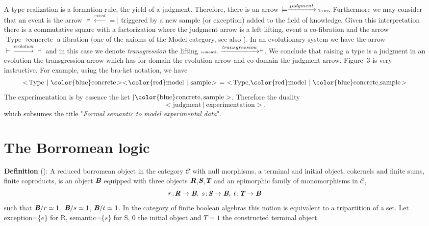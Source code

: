 \noindent
A type realization is a formation rule, the yield of a judgment. Therefore,
there is an arrow 
$\models\xrightarrow{judgment}\text{\tiny Type}$.
Furthermore we may consider that an event is the arrow 
$\models\xleftarrow{event}=\!\!\!|$ triggered by a new sample (or exception) added to the field of knowledge.
Given this interpretation there is a commutative square with a factorization where the 
judgment arrow is a left lifting, event a co-fibration and the arrow  
$\text{Type}\rightarrow\text{concrete}$
a fibration (one of the axioms of the Model category, see also \cite{awodey_2009}).
In an evolutionary system we have the arrow 
$\overset{}{\vdash}\xrightarrow{evolution}\overset{}{\dashv}$
and in this case we denote {\it transgression} the lifting 
$\overset{}{\text{\tiny semantic}}\xrightarrow{transgression}\overset{}{\vdash}$.  
We conclude that raising a type is a judgment in an evolution the transgression
arrow which has for domain the evolution arrow and co-domain the judgment arrow.
Figure~3 is very instructive. For example, using the bra-ket notation,
we have \begin{displaymath}
<\!\text{Type}~|~\text{\color{blue}concrete}\!
><\!\text{\color{red}model}~|~\text{sample}\!>~ =~ 
<\!\text{Type,{\color{red}model}}~|~\text{{\color{blue}concrete},sample}\!>
\end{displaymath}
The experimentation is by essence the ket $|\text{\color{blue}concrete},\text{sample}>$. Therefore
the duality 
\begin{displaymath}
<\!\text{judgment}~|~\text{experimentation}\!>.
\end{displaymath}
which subsumes the title "{\it Formal semantic to model experimental data}".

\section{The Borromean logic}
{\bf Definition} (\cite{guitart_2012}): A reduced borromean object in the category $\mathcal{C}$ with null morphisms,
a terminal and initial object, cokernels and finite sums, finite coproducts, is an object 
$\textbf{\em {B}}$ equipped with three objects $\textbf{\em {R}}$,$\textbf{\em {S}}$,$\textbf{\em {T}}$ and an epimorphic 
family of monomorphisms in  $\mathcal{C}$,
\begin{displaymath}
	r\!:\!\textbf{\em {R}}\rightarrow\textbf{\em {B}},\; s\!:\!\textbf{\em {S}}\rightarrow\textbf{\em {B}},\; t\!:\!\textbf{\em {T}}\rightarrow\textbf{\em {B}}
\end{displaymath}
such that 
$\textbf{\em {B}}/r\simeq 1$,  
$\textbf{\em {B}}/s\simeq 1$,
$\textbf{\em {B}}/t\simeq 1$. In the category of finite boolean algebras this notion is equivalent to a tripartition of a set.
Let 
exception=$\{e\}$ for R, 
semantic=$\{s\}$ for S,
0 the initial object and $T=1$ the constructed terminal object.

